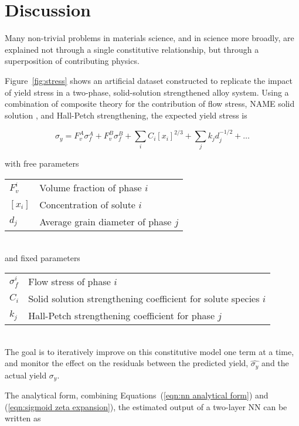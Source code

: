 \section{Discussion}\label{discussion}

Many non-trivial problems in materials science, and in science more broadly, are explained not through a single constitutive relationship, but through a superposition of contributing physics. 

Figure~\ref{fig:stress} shows an artificial dataset constructed to replicate the impact of yield stress in a two-phase, solid-solution strengthened alloy system. Using a combination of composite theory for the contribution of flow stress, {\color{red} NAME} solid solution \cite{solid solution}, and Hall-Petch \cite{Hall-Petch} strengthening, the expected yield stress is

\begin{equation}
	\sigma_y = F_v^A \sigma_f^A + F_v^B \sigma_f^B + \sum_i C_i [x_i]^{2/3} + \sum_j k_j d_j^{-1/2} + \ldots
\end{equation}

\noindent with free parameters \\[2ex]
\begin{tabular}{l l}
	$F_v^i$	& Volume fraction of phase $i$ \\
	$[x_i]$	& Concentration of solute $i$ \\
	$d_j$	& Average grain diameter of phase $j$
\end{tabular}
\\[2ex]
\noindent and fixed parameters \\[2ex]
\begin{tabular}{l l}
	$\sigma_f^i$	& Flow stress of phase $i$ \\
	$C_i$		& Solid solution strengthening coefficient for solute species $i$ \\
	$k_j$		& Hall-Petch strengthening coefficient for phase $j$
\end{tabular}
\\[2ex]

The goal is to iteratively improve on this constitutive model one term at a time, and monitor the effect on the residuals between the predicted yield, $\hat{\sigma_y}$ and the actual yield $\sigma_y$.

The analytical form, combining Equations~(\ref{eqn:nn analytical form}) and (\ref{eqn:sigmoid zeta expansion}), the estimated output of a two-layer NN can be written as

